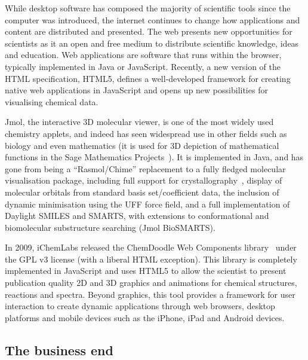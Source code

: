 \documentclass[10pt]{bmc_article}
\newenvironment{bmcformat}{\fussy\setboolean{publ}{true}}{\fussy}
\begin{document}
\begin{bmcformat}
While desktop software has composed the majority of scientific tools
since the computer was introduced, the internet continues to change
how applications and content are distributed and presented. The web
presents new opportunities for scientists as it
an open and free medium to distribute scientific knowledge, ideas and
education. Web applications are software that runs within the browser,
typically implemented in Java or JavaScript.
Recently, a new version of the HTML
specification, HTML5, defines a well-developed framework
for creating native web applications in JavaScript and opens up
new possibilities for visualising chemical data.

Jmol, the interactive 3D molecular viewer, is one of the most widely used
chemistry applets, and indeed has
seen widespread use in other fields such as biology and 
even mathematics (it is used for 3D depiction of mathematical
functions in the Sage Mathematics Projects~\cite{WebSage}). It is implemented
in Java, and has gone from being a ``Rasmol/Chime'' replacement to a fully fledged molecular
visualisation package, including full support for crystallography~\cite{Hanson2010},
display of molecular orbitals from standard basis set/coefficient data,
the inclusion of dynamic minimisation using the UFF force field, and
a full implementation of Daylight SMILES and SMARTS, with extensions to
conformational and biomolecular substructure searching (Jmol
BioSMARTS).

In 2009, iChemLabs released the ChemDoodle Web Components
library~\cite{ChemDoodleWeb} under the GPL v3 license (with a
liberal HTML exception). This library is completely implemented in JavaScript
and uses HTML5 to allow the scientist
to present publication quality 2D and 3D graphics and animations for
chemical structures, reactions and spectra. Beyond graphics, this tool
provides a framework for user interaction to create dynamic
applications through web browsers, desktop platforms and mobile
devices such as the iPhone, iPad and Android devices.

\subsection*{The business end}



\end{bmcformat}
\end{document}
